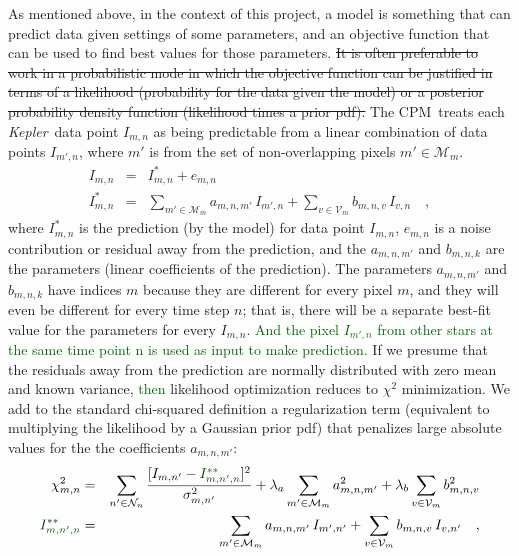\documentclass[12pt, preprint]{aastex}
\newcommand{\project}[1]{\textsl{#1}}
\newcommand{\Kepler}{\project{Kepler}}
\newcommand{\name}{CPM}
\newcommand{\set}[1]{\mathcal{#1}}
\newcommand{\revise}[1]{\textcolor{darkgreen}{#1}}
\newcommand{\remove}[1]{\sout{#1}}
\begin{document}
As mentioned above, in the context of this project,
  a model is something that can predict data given settings of some parameters,
  and an objective function that can be used to find best values for those parameters.
\remove{It is often preferable to work in a probabilistic mode in which the objective function can be justified
  in terms of a likelihood (probability for the data given the model)
  or a posterior probability density function (likelihood times a prior pdf).}
The \name\ treats each \Kepler\ data point $I_{m,n}$ as being
  predictable from a linear combination of data points $I_{m',n}$,
  where $m'$ is from the set of non-overlapping pixels $m'\in\set{M}_m$.
\begin{eqnarray}
I_{m,n}         &=& I^{\ast}_{m,n} + e_{m,n}
\\
I^{\ast}_{m,n}  &=& \sum_{m'\in\set{M}_m} a_{m,n,m'}\,I_{m',n} + \sum_{v\in\set{V}_m} b_{m,n,v}\,I_{v,n}
\quad,
\end{eqnarray}
where $I^{\ast}_{m,n}$ is the prediction (by the model) for data point $I_{m,n}$,
  $e_{m,n}$ is a noise contribution or residual away from the prediction,
  and the $a_{m,n,m'}$ and $b_{m,n,k}$ are the parameters (linear coefficients of the prediction).
The parameters $a_{m,n,m'}$ and $b_{m,n,k}$ have indices $m$ because
  they are different for every pixel $m$,
  and they will even be different for every time step $n$;
  that is, there will be a separate best-fit value for the parameters for every $I_{m,n}$.
\revise{And the pixel $I_{m',n}$ from other stars at the same time point n is used as input to make prediction.}
If we presume that the residuals away from the prediction are normally distributed with zero mean and known variance, \revise{then} likelihood optimization reduces to $\chi^2$ minimization.
We add to the standard chi-squared definition a regularization term
  (equivalent to multiplying the likelihood by a Gaussian prior pdf)
  that penalizes large absolute values for the the coefficients $a_{m,n,m'}$:
\begin{eqnarray}
\chi^2_{m,n}    &=& \sum_{n'\in\set{N}_n} \frac{[I_{m,n'} - \revise{I^{\ast\ast}_{m,n',n}}]^2}{\sigma^2_{m,n'}}
                 + \lambda_{a}\sum_{m'\in\set{M}_m}a_{m,n,m'}^2 + \lambda_{b}\sum_{v\in\set{V}_m}b_{m,n,v}^2
\\
\revise{I^{\ast\ast}_{m,n',n}} &=& \sum_{m'\in\set{M}_m} a_{m,n,m'}\,I_{m',n'} + \sum_{v\in\set{V}_m} b_{m,n,v}\,I_{v,n'}
\quad,
\end{eqnarray}
\end{document}
